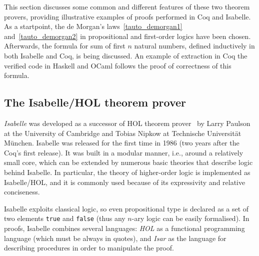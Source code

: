 \documentclass[article]{aaltoseries}
\begin{document}
This section discusses some common and different features of these two theorem provers, providing illustrative examples of proofs performed in Coq and Isabelle. As a startpoint, the de Morgan's laws~\eqref{tauto_demorgan1} and~\eqref{tauto_demorgan2} in propositional and first-order logics have been chosen. Afterwards, the formula for sum of first $n$ natural numbers, defined inductively in both Isabelle and Coq, is being discussed. An example of extraction in Coq the verified code in Haskell and OCaml follows the proof of correctness of this formula.



\subsection{The Isabelle/HOL theorem prover}
\label{sec:prover_isabelle}

\textit{Isabelle} was developed as a successor of HOL theorem prover~\cite{tool_HOL} by Larry Paulson at the University of Cambridge and Tobias Nipkow at Technische Universität München. Isabelle was released for the first time in 1986 (two years after the Coq's first release). It was built in a modular manner, i.e., around a relatively small core, which can be extended by numerous basic theories that describe logic behind Isabelle. In particular, the theory of higher-order logic is implemented as Isabelle/HOL, and it is commonly used because of its expressivity and relative conciseness. 

Isabelle exploits classical logic, so even propositional type is declared as a set of two elements \texttt{true} and \texttt{false} (thus any $n$-ary logic can be easily formalised). In proofs, Isabelle combines several languages: \textit{HOL} as a functional programming language (which must be always in quotes), and \textit{Isar} as the language for describing procedures in order to manipulate the proof.

\end{document}
